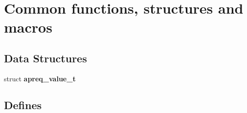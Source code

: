 \section{Common functions, structures and macros}
\label{group__Utils}
\subsection*{Data Structures}
\begin{CompactItemize}
\item 
struct {\bf apreq\_\-value\_\-t}
\end{CompactItemize}
\subsection*{Defines}

